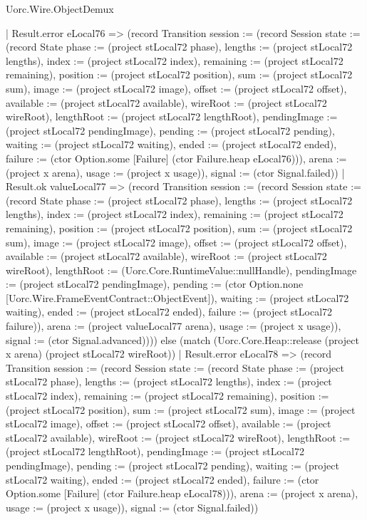 \begin{lexlean}{Uorc.Wire.ObjectDemux}
\begin{semanticmodule}
{      | Result.error eLocal76 => (record Transition {session := (record Session {state := (record State {phase := (project stLocal72 phase), lengths := (project stLocal72 lengths), index := (project stLocal72 index), remaining := (project stLocal72 remaining), position := (project stLocal72 position), sum := (project stLocal72 sum), image := (project stLocal72 image), offset := (project stLocal72 offset), available := (project stLocal72 available), wireRoot := (project stLocal72 wireRoot), lengthRoot := (project stLocal72 lengthRoot), pendingImage := (project stLocal72 pendingImage), pending := (project stLocal72 pending), waiting := (project stLocal72 waiting), ended := (project stLocal72 ended), failure := (ctor Option.some [Failure] (ctor Failure.heap eLocal76))}), arena := (project x arena), usage := (project x usage)}), signal := (ctor Signal.failed)})
      | Result.ok valueLocal77 => (record Transition {session := (record Session {state := (record State {phase := (project stLocal72 phase), lengths := (project stLocal72 lengths), index := (project stLocal72 index), remaining := (project stLocal72 remaining), position := (project stLocal72 position), sum := (project stLocal72 sum), image := (project stLocal72 image), offset := (project stLocal72 offset), available := (project stLocal72 available), wireRoot := (project stLocal72 wireRoot), lengthRoot := (Uorc.Core.RuntimeValue::nullHandle), pendingImage := (project stLocal72 pendingImage), pending := (ctor Option.none [Uorc.Wire.FrameEventContract::ObjectEvent]), waiting := (project stLocal72 waiting), ended := (project stLocal72 ended), failure := (project stLocal72 failure)}), arena := (project valueLocal77 arena), usage := (project x usage)}), signal := (ctor Signal.advanced)}))) else (match (Uorc.Core.Heap::release (project x arena) (project stLocal72 wireRoot))
      | Result.error eLocal78 => (record Transition {session := (record Session {state := (record State {phase := (project stLocal72 phase), lengths := (project stLocal72 lengths), index := (project stLocal72 index), remaining := (project stLocal72 remaining), position := (project stLocal72 position), sum := (project stLocal72 sum), image := (project stLocal72 image), offset := (project stLocal72 offset), available := (project stLocal72 available), wireRoot := (project stLocal72 wireRoot), lengthRoot := (project stLocal72 lengthRoot), pendingImage := (project stLocal72 pendingImage), pending := (project stLocal72 pending), waiting := (project stLocal72 waiting), ended := (project stLocal72 ended), failure := (ctor Option.some [Failure] (ctor Failure.heap eLocal78))}), arena := (project x arena), usage := (project x usage)}), signal := (ctor Signal.failed)})
}
\end{semanticmodule}
\end{lexlean}
